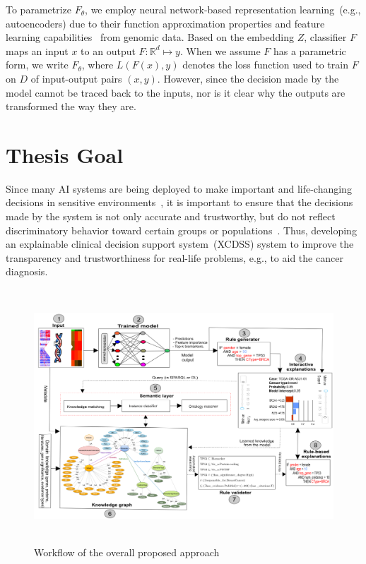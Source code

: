 \hspace*{3.5mm} To parametrize $F_{\theta}$, we employ neural network-based representation learning~(e.g., autoencoders) due to their function approximation properties and feature learning capabilities~\cite{xie2016unsupervised} from genomic data. Based on the embedding $Z$, classifier $F$ maps an input $x$ to an output $F: \mathbb{R}^{d} \mapsto y$. When we assume $F$ has a parametric form, we write $F_{\theta}$, where ${L}(F(x), y)$ denotes the loss function used to train $F$ on $D$ of input-output pairs $(x,y)$. However, since the decision made by the model cannot be traced back to the inputs, nor is it clear why the outputs are transformed the way they are. 

\section{Thesis Goal} \label{goals}
Since many AI systems are being deployed to make important and life-changing decisions in sensitive environments~\cite{stiglic2020interpretability}, it is important to ensure that the decisions made by the system is not only accurate and trustworthy, but do not reflect discriminatory behavior toward certain groups or populations~\cite{mehrabi2019survey}. Thus, developing an explainable clinical decision support system~(XCDSS) system to improve the transparency and trustworthiness for real-life problems, e.g., to aid the cancer diagnosis. 

\begin{figure}[h]
	\centering
	\includegraphics[width=\textwidth,height=95mm]{images/fair_rule_generator.png}	
    \caption{Workflow of the overall proposed approach}
	\label{fig:wf_overall_approach}
\end{figure}

